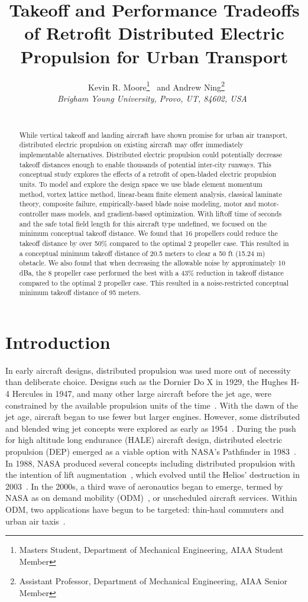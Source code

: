 \documentclass[conf]{new-aiaa}
\title{Takeoff and Performance Tradeoffs of Retrofit Distributed Electric Propulsion for Urban Transport}
\author{\
Kevin R. Moore\footnote{Masters Student, Department of Mechanical Engineering, AIAA Student Member}
\ and Andrew Ning\footnote{Assistant Professor, Department of Mechanical Engineering, AIAA Senior Member}\\
{\normalsize\itshape
Brigham Young University, Provo, UT, 84602, USA}\
\\
\
{
}
}
\begin{document}
\maketitle

\begin{abstract}
    While vertical takeoff and landing aircraft have shown promise for urban air transport, distributed electric propulsion on existing aircraft may offer immediately implementable alternatives. Distributed electric propulsion could potentially decrease takeoff distances enough to enable thousands of potential inter-city runways. This conceptual study explores the effects of a retrofit of open-bladed electric propulsion units. To model and explore the design space we use blade element momentum method, vortex lattice method, linear-beam finite element analysis, classical laminate theory, composite failure, empirically-based blade noise modeling, motor and motor-controller mass models, and gradient-based optimization. With liftoff time of seconds and the safe total field length for this aircraft type undefined, we focused on the minimum conceptual takeoff distance. We found that 16 propellers could reduce the takeoff distance by over 50\% compared to the optimal 2 propeller case. This resulted in a conceptual minimum takeoff distance of 20.5 meters to clear a 50 ft (15.24 m) obstacle. We also found that when decreasing the allowable noise by approximately 10 dBa, the 8 propeller case performed the best with a 43\% reduction in takeoff distance compared to the optimal 2 propeller case. This resulted in a noise-restricted conceptual minimum takeoff distance of 95 meters.

\end{abstract}

\section{Introduction}
\label{chp:chapter1}
\graphicspath{{figures/}}

In early aircraft designs, distributed propulsion was used more out of necessity than deliberate choice. Designs such as the Dornier Do X in 1929, the Hughes H-4 Hercules in 1947, and many other large aircraft before the jet age, were constrained by the available propulsion units of the time~\cite{Gohardani:2011aa}. With the dawn of the jet age, aircraft began to use fewer but larger engines. However, some distributed and blended wing jet concepts were explored as early as 1954~\cite{dist_jet}. During the push for high altitude long endurance (HALE) aircraft design, distributed electric propulsion (DEP) emerged as a viable option with NASA's Pathfinder in 1983~\cite{Flittie:1998aa}. In 1988, NASA produced several concepts including distributed propulsion with the intention of lift augmentation~\cite{nasa_many_distrib}, which evolved until the Helios' destruction in 2003~\cite{Helios}. In the 2000s, a third wave of aeronautics began to emerge, termed by NASA as on demand mobility (ODM)~\cite{Moore:2006aa}, or unscheduled aircraft services. Within ODM, two applications have begun to be targeted: thin-haul commuters and urban air taxis~\cite{Hwang:2018aa}.
\end{document}
